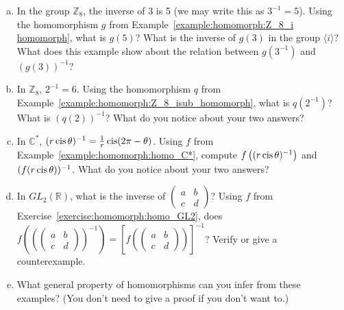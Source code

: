 \begin{exercise}\label{exercise:homomorph:homo_ex_inverses}
\begin{enumerate}[(a)]
\item
In the group ${\mathbb Z}_8$, the inverse of 3 is 5 (we may write this as $3^{-1} = 5$).  Using the homomorphism $g$ from Example~\ref{example:homomorph:Z_8_i homomorph}, what is $g(5)$?  What is the inverse of $g(3)$ in the group $\langle i \rangle$? What does this example show about the relation between $g(3^{-1})$ and $(g(3))^{-1}$?
\item
In ${\mathbb Z}_8$, $2^{-1} = 6$.  Using the homomorphism $q$ from Example~\ref{example:homomorph:Z_8_isub_homomorph}, what is $q(2^{-1})$?  What is $(q(2))^{-1}$? What do you notice about your two answers?
\item
In  ${\mathbb C}^\ast$, $(r \operatorname{cis} \theta)^{-1} = \frac{1}{r} \operatorname{cis} (2\pi - \theta)$.  Using $f$ from Example~\ref{example:homomorph:homo_C*},  compute $f\left((r \operatorname{cis} \theta)^{-1}\right)$ and $(f(r \operatorname{cis} \theta))^{-1}$. What do you notice about your two answers? 
\item
In $GL_2( {\mathbb R })$, what is the inverse of
$\begin{pmatrix}
a & b \\
c & d
\end{pmatrix}$?
Using $f$ from Exercise~\ref{exercise:homomorph:homo_GL2}, does $f\left((\begin{pmatrix} a & b \\ c & d \end{pmatrix})^{-1}\right) = [f(\begin{pmatrix} a & b \\ c & d \end{pmatrix})]^{-1}$?  Verify or give a counterexample.
\item
What general property of homomorphisms can you infer from these examples? (You don't need to give a proof if you don't want to.)
\end{enumerate}
\end{exercise}






 

 


